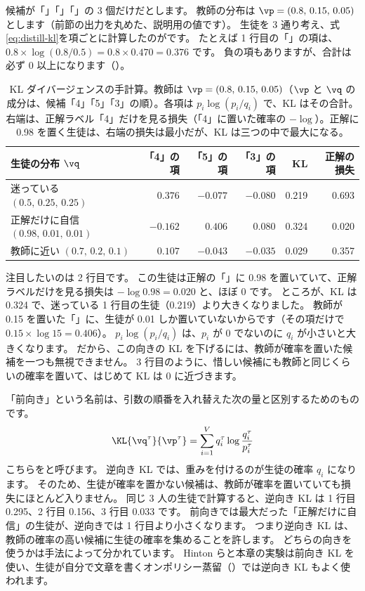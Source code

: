 \begin{example}[KL を手で計算する]
候補が「」「」「」の 3 個だけだとします。
教師の分布は $\vp=(0.8,\,0.15,\,0.05)$ とします（前節の出力を丸めた、説明用の値です）。
生徒を 3 通り考え、式\eqref{eq:distill-kl}を項ごとに計算したのがです。
たとえば 1 行目の「」の項は、$0.8\times\log(0.8/0.5)=0.8\times0.470=0.376$ です。
負の項もありますが、合計は必ず 0 以上になります（）。
\end{example}

\begin{table}[tbp]
\centering
\caption{KL ダイバージェンスの手計算。教師は $\vp=(0.8,\,0.15,\,0.05)$（$\vp$ と $\vq$ の成分は、候補「4」「5」「3」の順）。各項は $p_i\log(p_i/q_i)$ で、KL はその合計。
右端は、正解ラベル「4」だけを見る損失（「4」に置いた確率の $-\log$）。正解に 0.98 を置く生徒は、右端の損失は最小だが、KL は三つの中で最大になる。}
\label{tab:distill-kl-example}
\small
\begin{tabular}{lrrrrr}
\toprule
生徒の分布 $\vq$ & 「4」の項 & 「5」の項 & 「3」の項 & KL & 正解の損失 \\
\midrule
迷っている $(0.5,\,0.25,\,0.25)$ & $0.376$ & $-0.077$ & $-0.080$ & 0.219 & 0.693 \\
正解だけに自信 $(0.98,\,0.01,\,0.01)$ & $-0.162$ & $0.406$ & $0.080$ & 0.324 & 0.020 \\
教師に近い $(0.7,\,0.2,\,0.1)$ & $0.107$ & $-0.043$ & $-0.035$ & 0.029 & 0.357 \\
\bottomrule
\end{tabular}
\end{table}

注目したいのは 2 行目です。
この生徒は正解の「」に 0.98 を置いていて、正解ラベルだけを見る損失は $-\log 0.98=0.020$ と、ほぼ 0 です。
ところが、KL は 0.324 で、迷っている 1 行目の生徒（0.219）より大きくなりました。
教師が 0.15 を置いた「」に、生徒が 0.01 しか置いていないからです（その項だけで $0.15\times\log 15=0.406$）。
$p_i\log(p_i/q_i)$ は、$p_i$ が 0 でないのに $q_i$ が小さいと大きくなります。
だから、この向きの KL を下げるには、教師が確率を置いた候補を一つも無視できません。
3 行目のように、惜しい候補にも教師と同じくらいの確率を置いて、はじめて KL は 0 に近づきます。

「前向き」という名前は、引数の順番を入れ替えた次の量と区別するためのものです。
\[
\KL{\vq^\tau}{\vp^\tau}=\sum_{i=1}^{V}q^\tau_i\log\frac{q^\tau_i}{p^\tau_i}
\]
こちらをと呼びます。
逆向き KL では、重みを付けるのが生徒の確率 $q_i$ になります。
そのため、生徒が確率を置かない候補は、教師が確率を置いていても損失にほとんど入りません。
同じ 3 人の生徒で計算すると、逆向き KL は 1 行目 0.295、2 行目 0.156、3 行目 0.033 です。
前向きでは最大だった「正解だけに自信」の生徒が、逆向きでは 1 行目より小さくなります。
つまり逆向き KL は、教師の確率の高い候補に生徒の確率を集めることを許します。
どちらの向きを使うかは手法によって分かれています。
Hinton らと本章の実験は前向き KL を使い、生徒が自分で文章を書くオンポリシー蒸留（）では逆向き KL もよく使われます。

